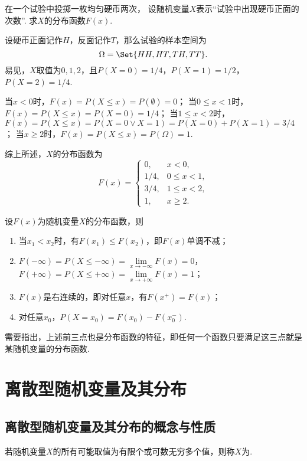 \begin{example}
在一个试验中投掷一枚均匀硬币两次，
设随机变量\(X\)表示“试验中出现硬币正面的次数”.
求\(X\)的分布函数\(F(x)\).
\begin{solution}
设硬币正面记作\(H\)，反面记作\(T\)，那么试验的样本空间为\[
	\Omega = \Set{ HH, HT, TH, TT }.
\]
易见，\(X\)取值为\(0,1,2\)，且\(P(X=0) = 1/4\)，\(P(X=1) = 1/2\)，\(P(X=2) = 1/4\).

当\(x < 0\)时，\(F(x) = P(X \leq x) = P(\emptyset) = 0\)；
当\(0 \leq x < 1\)时，\(F(x) = P(X \leq x) = P(X=0) = 1/4\)；
当\(1 \leq x < 2\)时，\(F(x) = P(X \leq x) = P(X=0 \lor X=1) = P(X=0)+P(X=1) = 3/4\)；
当\(x \geq 2\)时，\(F(x) = P(X \leq x) = P(\Omega) = 1\).

综上所述，\(X\)的分布函数为\[
	F(x) = \left\{ \begin{array}{cl}
		0, & x < 0, \\
		1/4, & 0 \leq x < 1, \\
		3/4, & 1 \leq x < 2, \\
		1, & x \geq 2.
	\end{array} \right.
\]
\end{solution}
\end{example}

\begin{property}
设\(F(x)\)为随机变量\(X\)的分布函数，则
\begin{enumerate}
	\item 当\(x_1 < x_2\)时，有\(F(x_1) \leq F(x_2)\)，即\(F(x)\)单调不减；
	\item \(F(-\infty)=P(X \leq -\infty) = \lim\limits_{x \to -\infty}{F(x)} = 0\)，
	\(F(+\infty)=P(X \leq +\infty) = \lim\limits_{x \to +\infty}{F(x)} = 1\)；
	\item \(F(x)\)是右连续的，即对任意\(x\)，有\(F(x^+)=F(x)\)；
	\item 对任意\(x_0\)，\(P(X=x_0)=F(x_0)-F(x_0^-)\).
\end{enumerate}
\end{property}
需要指出，上述前三点也是分布函数的特征，即任何一个函数只要满足这三点就是某随机变量的分布函数.

\section{离散型随机变量及其分布}
\subsection{离散型随机变量及其分布的概念与性质}
\begin{definition}
若随机变量\(X\)的所有可能取值为有限个或可数无穷多个值，则称\(X\)为.
\end{definition}

